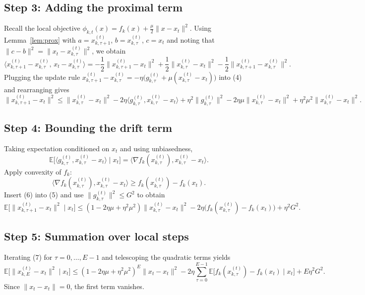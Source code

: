 \documentclass[11pt]{article}
\begin{document}
\subsection*{Step 3: Adding the proximal term}
Recall the local objective $\phi_{k,t}(x)=f_k(x)+\frac{\mu}{2}\|x-x_t\|^2$.
Using Lemma~\ref{lem:prox} with $a=x_{k,\tau+1}^{(t)}$, $b=x_{k,\tau}^{(t)}$, $c=x_t$ and noting that $\|c-b\|^2=\|x_t-x_{k,\tau}^{(t)}\|^2$, we obtain
\[
\langle x_{k,\tau+1}^{(t)}-x_{k,\tau}^{(t)},\,x_t-x_{k,\tau}^{(t)}\rangle
= -\frac12\|x_{k,\tau+1}^{(t)}-x_t\|^2+\frac12\|x_{k,\tau}^{(t)}-x_t\|^2-\frac12\|x_{k,\tau+1}^{(t)}-x_{k,\tau}^{(t)}\|^2 . \tag{4}
\]
Plugging the update rule $x_{k,\tau+1}^{(t)}-x_{k,\tau}^{(t)}=-\eta\bigl(g_{k,\tau}^{(t)}+\mu(x_{k,\tau}^{(t)}-x_t)\bigr)$ into (4) and rearranging gives
\[
\|x_{k,\tau+1}^{(t)}-x_t\|^2
\le \|x_{k,\tau}^{(t)}-x_t\|^2
-2\eta\langle g_{k,\tau}^{(t)},x_{k,\tau}^{(t)}-x_t\rangle
+ \eta^2\|g_{k,\tau}^{(t)}\|^2
-2\eta\mu\|x_{k,\tau}^{(t)}-x_t\|^2
+\eta^2\mu^2\|x_{k,\tau}^{(t)}-x_t\|^2 . \tag{5}
\]

\subsection*{Step 4: Bounding the drift term}
Taking expectation conditioned on $x_t$ and using unbiasedness,
\[
\mathbb{E}\!\bigl[\langle g_{k,\tau}^{(t)},x_{k,\tau}^{(t)}-x_t\rangle\mid x_t\bigr]
= \langle \nabla f_k(x_{k,\tau}^{(t)}),x_{k,\tau}^{(t)}-x_t\rangle .
\]
Apply convexity of $f_k$:
\[
\langle \nabla f_k(x_{k,\tau}^{(t)}),x_{k,\tau}^{(t)}-x_t\rangle
\ge f_k(x_{k,\tau}^{(t)})-f_k(x_t). \tag{6}
\]
Insert (6) into (5) and use $\|g_{k,\tau}^{(t)}\|^2\le G^2$ to obtain
\[
\mathbb{E}\!\bigl[\|x_{k,\tau+1}^{(t)}-x_t\|^2\mid x_t\bigr]
\le (1-2\eta\mu+\eta^2\mu^2)\|x_{k,\tau}^{(t)}-x_t\|^2
-2\eta\bigl(f_k(x_{k,\tau}^{(t)})-f_k(x_t)\bigr)
+\eta^2 G^2 . \tag{7}
\]

\subsection*{Step 5: Summation over local steps}
Iterating (7) for $\tau=0,\dots,E-1$ and telescoping the quadratic terms yields
\[
\mathbb{E}\!\bigl[\|x_{k,E}^{(t)}-x_t\|^2\mid x_t\bigr]
\le (1-2\eta\mu+\eta^2\mu^2)^{E}\|x_t-x_t\|^2
-2\eta\sum_{\tau=0}^{E-1}\mathbb{E}\!\bigl[f_k(x_{k,\tau}^{(t)})-f_k(x_t)\mid x_t\bigr]
+E\eta^2G^2 . \tag{8}
\]
Since $\|x_t-x_t\|=0$, the first term vanishes.
\end{document}
